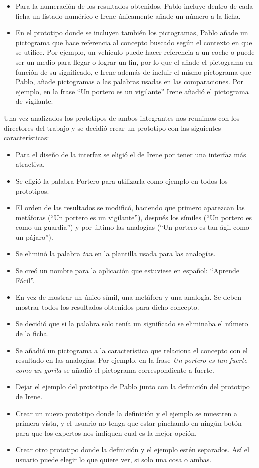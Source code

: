 \begin{itemize}
	\item Para la numeración de los resultados obtenidos, Pablo incluye dentro de cada ficha un listado numérico e Irene únicamente añade un número a la ficha.
	
	\item En el prototipo donde se incluyen también los pictogramas, Pablo añade un pictograma que hace referencia al concepto buscado según el contexto en que se utilice. Por ejemplo, un vehículo puede hacer referencia a un coche o puede ser un medio para llegar o lograr un fin, por lo que el añade el pictograma en función de su significado, e Irene además de incluir el mismo pictograma que Pablo, añade pictogramas a las palabras usadas en las comparaciones. Por ejemplo, en la frase ``Un portero es un vigilante'' Irene añadió el pictograma de vigilante.
\end{itemize}



Una vez analizados los prototipos de ambos integrantes nos reunimos con los directores del trabajo y se decidió crear un prototipo con las siguientes características:


\begin{itemize}
	\item Para el diseño de la interfaz se eligió el de Irene por tener una interfaz más atractiva.
	\item Se eligió la palabra Portero para utilizarla como ejemplo en todos los prototipos.
	\item El orden de las resultados se modificó, haciendo que primero aparezcan las metáforas (``Un portero es un vigilante''), después los símiles (``Un portero es como un guardia'') y por último las analogías  (``Un portero es tan ágil como un pájaro'').
	\item Se eliminó la palabra \textit{tan} en la plantilla usada para las analogías.
	\item Se creó un nombre para la aplicación que estuviese en español: ``Aprende Fácil''.
	\item En vez de mostrar un único símil, una metáfora y una analogía. Se deben mostrar todos los resultados obtenidos para dicho concepto.
	\item Se decidió que si la palabra solo tenía un significado se eliminaba el número de la ficha.
	\item Se añadió un pictograma a la característica que relaciona el concepto con el resultado en las analogías. Por ejemplo, en la frase \textit{Un portero es tan fuerte como un gorila}  se añadió el pictograma correspondiente a fuerte.
	\item Dejar el ejemplo del prototipo de Pablo junto con la definición del prototipo de Irene.
	\item Crear un nuevo prototipo donde la definición y el ejemplo se muestren a primera vista, y el usuario no tenga que estar pinchando en ningún botón para que los expertos nos indiquen cual es la mejor opción.
	\item Crear otro prototipo donde la definición y el ejemplo estén separados. Así el usuario puede elegir lo que quiere ver, si solo una cosa o ambas.
\end{itemize} 

